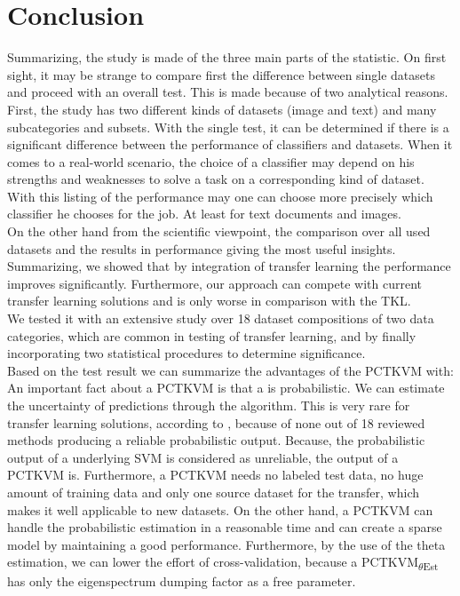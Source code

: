 \section{Conclusion}\label{EmSecConc}
Summarizing, the study is made of the three main parts of the statistic. On first sight, it may be strange to compare first the difference between single datasets and proceed with an overall test. This is made because of two analytical reasons. First, the study has two different kinds of datasets (image and text) and many subcategories and subsets. With the single test, it can be determined if there is a significant difference between the performance of classifiers and datasets. When it comes to a real-world scenario, the choice of a classifier may depend on his strengths and weaknesses to solve a task on a corresponding kind of dataset. With this listing of the performance may one can choose more precisely which classifier he chooses for the job. At least for text documents and images.\\
On the other hand from the scientific viewpoint, the comparison over all used datasets and the results in performance giving the most useful insights.\\
Summarizing, we showed that by integration of transfer learning the performance improves significantly. Furthermore, our approach can compete with current transfer learning solutions and is only worse in comparison with the \acs{TKL}.\\
We tested it with an extensive study over 18 dataset compositions of two data categories, which are common in testing of transfer learning, and by finally incorporating two statistical procedures to determine significance.\\
Based on the test result we can summarize the advantages of the \acs{PCTKVM} with:
An important fact about a \acs{PCTKVM} is that a is probabilistic. We can estimate the uncertainty of predictions through the algorithm.
This is very rare for transfer learning solutions, according to \cite{Weiss.2016}, because of none out of 18 reviewed methods producing a reliable probabilistic output.
Because, the probabilistic output of a underlying \acs{SVM} is considered as unreliable\cite{Tipping.2001}, the output of a \acs{PCTKVM} is.\cite{Chen.2009}
Furthermore, a \acs{PCTKVM} needs no labeled test data, no huge amount of training data and only one source dataset for the transfer, which makes it well applicable to new datasets.
On the other hand, a \acs{PCTKVM} can handle the probabilistic estimation in a reasonable time and can create a sparse model by maintaining a good performance.
Furthermore, by the use of the theta estimation, we can lower the effort of cross-validation, because a \acs{PCTKVM}\textsubscript{$\theta$Est} has only the eigenspectrum dumping factor as a free parameter.

